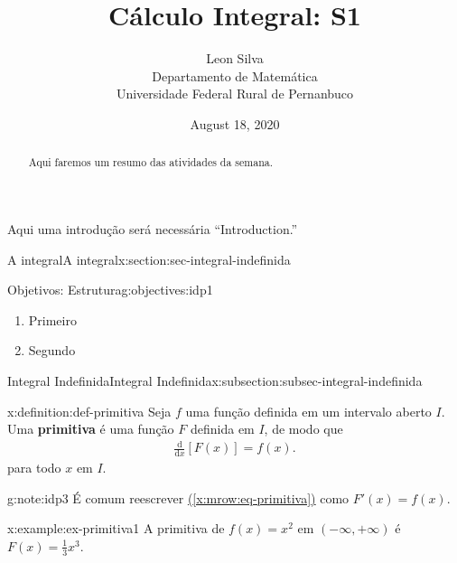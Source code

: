 \documentclass[oneside,10pt,]{article}
\title{Cálculo Integral: S1}
\author{Leon Silva\\
Departamento de Matemática\\
Universidade Federal Rural de Pernanbuco
}
\date{August 18, 2020}
\newcommand{\xreffont}{\relax}
\newcommand{\terminology}[1]{\textbf{#1}}
\numberwithin{equation}{section}
\newcommand{\dd}{\mathrm{d}}
\begin{document}
\hypertarget{x:article:calc-integral}{}
\maketitle
\thispagestyle{empty}
\begin{abstract}
Aqui faremos um resumo das atividades da semana.%
\end{abstract}
\begin{introduction}{}%
Aqui uma introdução será necessária ``Introduction.''%
\end{introduction}%
%
%
\typeout{************************************************}
\typeout{************************************************}
%
\begin{sectionptx}{A integral}{}{A integral}{}{}{x:section:sec-integral-indefinida}
\begin{objectives}{Objetivos: Estrutura}{g:objectives:idp1}
%
\begin{enumerate}
\item{}Primeiro%
\item{}Segundo%
\end{enumerate}
\end{objectives}
%
%
\typeout{************************************************}
\typeout{************************************************}
%
\begin{subsectionptx}{Integral Indefinida}{}{Integral Indefinida}{}{}{x:subsection:subsec-integral-indefinida}
\begin{definition}{}{x:definition:def-primitiva}%
Seja \(f\) uma função definida em um intervalo aberto\footnotemark{} \(I\). Uma \terminology{primitiva} é uma função \(F\) definida em \(I\), de modo que%
\begin{gather}
\frac{\dd}{\dd x}\left[F(x)\right]=f(x). \label{x:mrow:eq-primitiva}
\end{gather}
para todo \(x\) em \(I\).%
\end{definition}
%
\begin{note}{}{g:note:idp3}%
É comum reescrever \hyperref[x:mrow:eq-primitiva]{({\xreffont\ref{x:mrow:eq-primitiva}})} como \(F'(x)=f(x)\).%
\end{note}
\begin{example}{}{x:example:ex-primitiva1}%
A primitiva de \(f(x)=x^2\) em \((-\infty, +\infty)\) é \(F(x)=\frac{1}{3}x^3\).%
\par\smallskip%

\end{example}
\end{subsectionptx}
\end{sectionptx}
\end{document}
